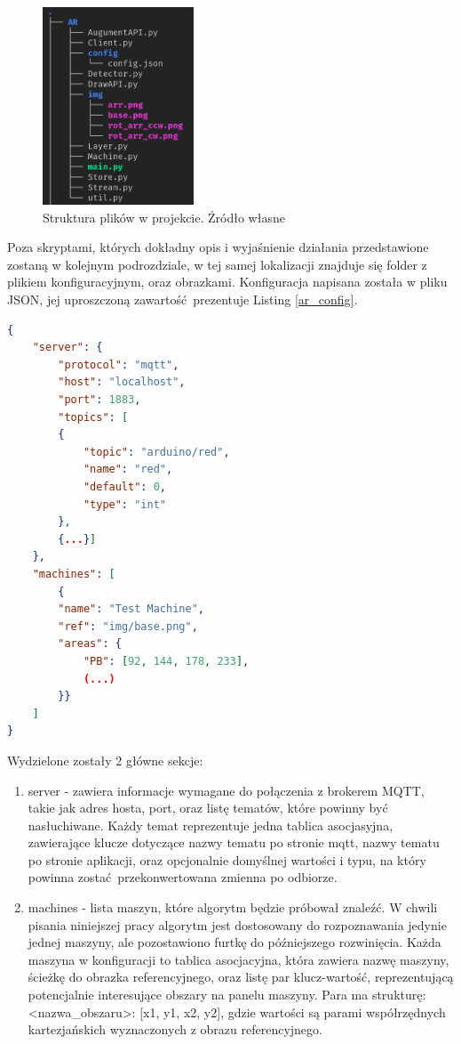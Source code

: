 \documentclass[12pt,twoside,polish]{article}
\begin{document}
\begin{figure}[h]
	\centering
	\includegraphics[width=0.4\textwidth]{dirs_ar}
	\caption{Struktura plików w projekcie. Źródło własne}
	\label{dirs_ar_ref}
\end{figure}

Poza skryptami, których dokładny opis i wyjaśnienie działania przedstawione zostaną w kolejnym podrozdziale, w tej samej lokalizacji znajduje się folder z plikiem konfiguracyjnym, oraz obrazkami. Konfiguracja napisana została w pliku JSON, jej uproszczoną zawartość prezentuje Listing \ref{ar_config}.

\begin{lstlisting}[language=json,firstnumber=1,caption=Plik konfiguracyjny użyty w projekcie, label=ar_config]
{
	"server": {
		"protocol": "mqtt",
		"host": "localhost",
		"port": 1883,
		"topics": [
		{
			"topic": "arduino/red",
			"name": "red",
			"default": 0,
			"type": "int"
		},
		{...}]
	},
	"machines": [
		{
		"name": "Test Machine",
		"ref": "img/base.png",
		"areas": {
			"PB": [92, 144, 178, 233],
			(...)
		}}
	]
}
\end{lstlisting}

Wydzielone zostały 2 główne sekcje:

\begin{enumerate}[label=\alph*), leftmargin=1.25cm]
	\item server - zawiera informacje wymagane do połączenia z brokerem MQTT, takie jak adres hosta, port, oraz listę tematów, które powinny być nasłuchiwane. Każdy temat reprezentuje jedna tablica asocjasyjna, zawierające klucze dotyczące nazwy tematu po stronie mqtt, nazwy tematu po stronie aplikacji, oraz opcjonalnie domyślnej wartości i typu, na który powinna zostać przekonwertowana zmienna po odbiorze.
	\item machines - lista maszyn, które algorytm będzie próbował znaleźć. W chwili pisania niniejszej pracy algorytm jest dostosowany do rozpoznawania jedynie jednej maszyny, ale pozostawiono furtkę do późniejszego rozwinięcia. Każda maszyna w konfiguracji to tablica asocjacyjna, która zawiera nazwę maszyny, ścieżkę do obrazka referencyjnego, oraz listę par klucz-wartość, reprezentującą potencjalnie interesujące obszary na panelu maszyny. Para ma strukturę: <nazwa\_obszaru>: [x1, y1, x2, y2], gdzie wartości są parami współrzędnych kartezjańskich wyznaczonych z obrazu referencyjnego.
\end{enumerate}
\end{document}
